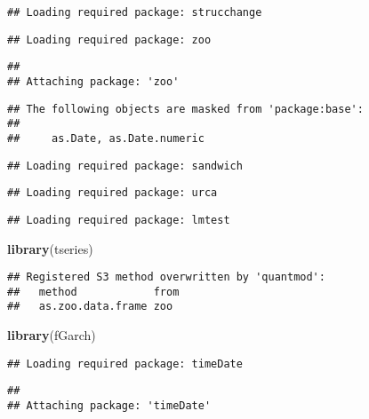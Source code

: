 \documentclass[
]{article}
\newenvironment{Shaded}{\begin{snugshade}}{\end{snugshade}}
\newcommand{\KeywordTok}[1]{\textcolor[rgb]{0.13,0.29,0.53}{\textbf{#1}}}
\newcommand{\NormalTok}[1]{#1}
\begin{document}
\begin{verbatim}
## Loading required package: strucchange
\end{verbatim}

\begin{verbatim}
## Loading required package: zoo
\end{verbatim}

\begin{verbatim}
## 
## Attaching package: 'zoo'
\end{verbatim}

\begin{verbatim}
## The following objects are masked from 'package:base':
## 
##     as.Date, as.Date.numeric
\end{verbatim}

\begin{verbatim}
## Loading required package: sandwich
\end{verbatim}

\begin{verbatim}
## Loading required package: urca
\end{verbatim}

\begin{verbatim}
## Loading required package: lmtest
\end{verbatim}

\begin{Shaded}
\begin{Highlighting}[]
\KeywordTok{library}\NormalTok{(tseries)}
\end{Highlighting}
\end{Shaded}

\begin{verbatim}
## Registered S3 method overwritten by 'quantmod':
##   method            from
##   as.zoo.data.frame zoo
\end{verbatim}

\begin{Shaded}
\begin{Highlighting}[]
\KeywordTok{library}\NormalTok{(fGarch)}
\end{Highlighting}
\end{Shaded}

\begin{verbatim}
## Loading required package: timeDate
\end{verbatim}

\begin{verbatim}
## 
## Attaching package: 'timeDate'
\end{verbatim}
\end{document}
